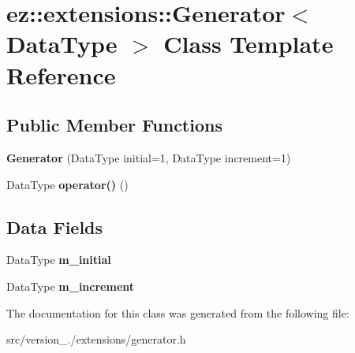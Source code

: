 \hypertarget{classez_1_1extensions_1_1Generator}{}\section{ez\+:\+:extensions\+:\+:Generator$<$ Data\+Type $>$ Class Template Reference}
\label{classez_1_1extensions_1_1Generator}
\subsection*{Public Member Functions}
\begin{DoxyCompactItemize}
\item 
\mbox{\label{classez_1_1extensions_1_1Generator_aa1ad45d137f72ca49ad106ce802f6879}} 
{\bfseries Generator} (Data\+Type initial=1, Data\+Type increment=1)
\item 
\mbox{\label{classez_1_1extensions_1_1Generator_af462de2c0915a4c808a679872973e722}} 
Data\+Type {\bfseries operator()} ()
\end{DoxyCompactItemize}
\subsection*{Data Fields}
\begin{DoxyCompactItemize}
\item 
\mbox{\label{classez_1_1extensions_1_1Generator_a9926ada804b51a3ea78804f05f8ad25a}} 
Data\+Type {\bfseries m\+\_\+initial}
\item 
\mbox{\label{classez_1_1extensions_1_1Generator_aa4887f0e6a0d77671239d665fde9d4df}} 
Data\+Type {\bfseries m\+\_\+increment}
\end{DoxyCompactItemize}


The documentation for this class was generated from the following file\+:\begin{DoxyCompactItemize}
\item 
src/version\+\_./extensions/generator.\+h\end{DoxyCompactItemize}
